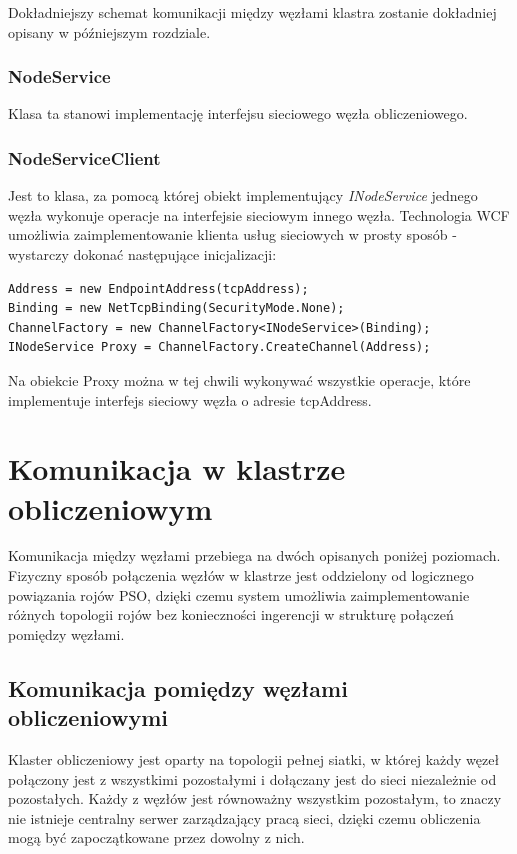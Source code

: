 \documentclass[12pt, twoside, openany, abstract=on]{report}
\theoremstyle{definition}
\begin{document}
Dokładniejszy schemat komunikacji między węzłami klastra zostanie dokładniej opisany w późniejszym rozdziale.

\subsubsection{NodeService}
Klasa ta stanowi implementację interfejsu sieciowego węzła obliczeniowego.

\subsubsection{NodeServiceClient}
Jest to klasa, za pomocą której obiekt implementujący \textit{INodeService} jednego węzła wykonuje operacje na interfejsie sieciowym innego węzła. Technologia WCF umożliwia zaimplementowanie klienta usług sieciowych w prosty sposób - wystarczy dokonać następujące inicjalizacji:

\begin{lstlisting}[frame=single]
Address = new EndpointAddress(tcpAddress);
Binding = new NetTcpBinding(SecurityMode.None);
ChannelFactory = new ChannelFactory<INodeService>(Binding);
INodeService Proxy = ChannelFactory.CreateChannel(Address);
\end{lstlisting}             

Na obiekcie Proxy można w tej chwili wykonywać wszystkie operacje, które implementuje interfejs sieciowy węzła o adresie tcpAddress.

\section{Komunikacja w klastrze obliczeniowym}
Komunikacja między węzłami przebiega na dwóch opisanych poniżej poziomach. Fizyczny sposób połączenia węzłów w klastrze jest oddzielony od logicznego powiązania rojów PSO, dzięki czemu system umożliwia zaimplementowanie różnych topologii rojów bez konieczności ingerencji w strukturę połączeń pomiędzy węzłami.

\subsection{Komunikacja pomiędzy węzłami obliczeniowymi}
Klaster obliczeniowy jest oparty na topologii pełnej siatki, w której każdy węzeł połączony jest z wszystkimi pozostałymi i dołączany jest do sieci niezależnie od pozostałych. Każdy z węzłów jest równoważny wszystkim pozostałym, to znaczy nie istnieje centralny serwer zarządzający pracą sieci, dzięki czemu obliczenia mogą być zapoczątkowane przez dowolny z nich.
\end{document}
